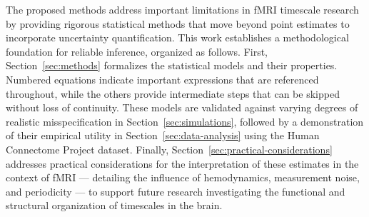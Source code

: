 \documentclass[docs/main.tex]{subfiles}
\begin{document}
The proposed methods address important limitations in fMRI timescale research by providing rigorous statistical methods that move beyond point estimates to incorporate uncertainty quantification. This work establishes a methodological foundation for reliable inference, organized as follows. First, Section~\ref{sec:methods} formalizes the statistical models and their properties. Numbered equations indicate important expressions that are referenced throughout, while the others provide intermediate steps that can be skipped without loss of continuity. These models are validated against varying degrees of realistic misspecification in Section~\ref{sec:simulations}, followed by a demonstration of their empirical utility in Section~\ref{sec:data-analysis} using the Human Connectome Project dataset. Finally, Section~\ref{sec:practical-considerations} addresses practical considerations for the interpretation of these estimates in the context of fMRI --- detailing the influence of hemodynamics, measurement noise, and periodicity --- to support future research investigating the functional and structural organization of timescales in the brain.
\end{document}
